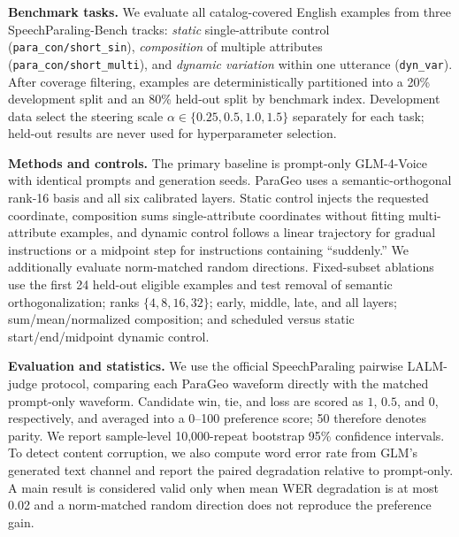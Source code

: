 \documentclass{article}
\begin{document}
\textbf{Benchmark tasks.}
We evaluate all catalog-covered English examples from three SpeechParaling-Bench tracks: \emph{static} single-attribute control (\texttt{para\_con/short\_sin}), \emph{composition} of multiple attributes (\texttt{para\_con/short\_multi}), and \emph{dynamic variation} within one utterance (\texttt{dyn\_var}). After coverage filtering, examples are deterministically partitioned into a 20\% development split and an 80\% held-out split by benchmark index. Development data select the steering scale $\alpha\in\{0.25,0.5,1.0,1.5\}$ separately for each task; held-out results are never used for hyperparameter selection.

\textbf{Methods and controls.}
The primary baseline is prompt-only GLM-4-Voice with identical prompts and generation seeds. ParaGeo uses a semantic-orthogonal rank-16 basis and all six calibrated layers. Static control injects the requested coordinate, composition sums single-attribute coordinates without fitting multi-attribute examples, and dynamic control follows a linear trajectory for gradual instructions or a midpoint step for instructions containing ``suddenly.'' We additionally evaluate norm-matched random directions. Fixed-subset ablations use the first 24 held-out eligible examples and test removal of semantic orthogonalization; ranks $\{4,8,16,32\}$; early, middle, late, and all layers; sum/mean/normalized composition; and scheduled versus static start/end/midpoint dynamic control.

\textbf{Evaluation and statistics.}
We use the official SpeechParaling pairwise LALM-judge protocol, comparing each ParaGeo waveform directly with the matched prompt-only waveform. Candidate win, tie, and loss are scored as $1$, $0.5$, and $0$, respectively, and averaged into a 0--100 preference score; 50 therefore denotes parity. We report sample-level 10,000-repeat bootstrap 95\% confidence intervals. To detect content corruption, we also compute word error rate from GLM's generated text channel and report the paired degradation relative to prompt-only. A main result is considered valid only when mean WER degradation is at most 0.02 and a norm-matched random direction does not reproduce the preference gain.

% 
% 
% 



\end{document}
